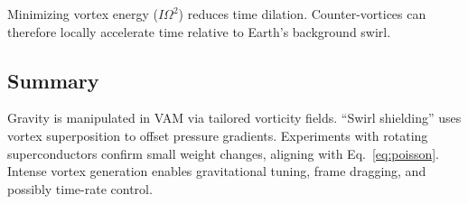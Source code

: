 Minimizing vortex energy ($I\Omega^2$) reduces time dilation. Counter-vortices can therefore locally accelerate time relative to Earth’s background swirl.

\subsection{Summary}
Gravity is manipulated in VAM via tailored vorticity fields. “Swirl shielding” uses vortex superposition to offset pressure gradients. Experiments with rotating superconductors confirm small weight changes, aligning with Eq.~\eqref{eq:poisson}. Intense vortex generation enables gravitational tuning, frame dragging, and possibly time-rate control.
